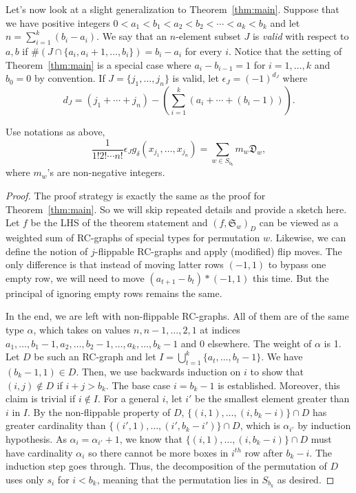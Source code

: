 \documentclass[10pt]{amsart}
\newcommand{\D}{\mathfrak{D}}
\begin{document}
Let's now look at a slight generalization to Theorem~\ref{thm:main}. Suppose that we have positive integers $0<a_1<b_1<a_2<b_2<\cdots<a_k<b_k$ and let $n=\sum_{i=1}^k(b_i-a_i)$. We say that an $n$-element subset $J$ is \emph{valid} with respect to $a,b$ if $\#(J\cap \{a_i,a_i+1,\ldots,b_i\})=b_i-a_i$ for every $i$. Notice that the setting of Theorem~\ref{thm:main} is a special case where $a_{i}-b_{i-1}=1$ for $i=1,\ldots,k$ and $b_{0}=0$ by convention. If $J=\{j_1,\ldots,j_n\}$ is valid, let $\epsilon_J=(-1)^{d_J}$ where 
\[
d_J=(j_1+\cdots+j_n)-\left(\sum_{i=1}^k(a_i+\cdots+(b_i-1))\right).
\]

\begin{theorem}\label{thm:gen}
Use notations as above, 
\[
\frac{1}{1!2!\cdots n!}\epsilon_Jg_{\delta}(x_{j_1},\ldots,x_{j_n})=\sum_{w\in S_{b_k}}m_w\D_w,
\]
where $m_w$'s are non-negative integers.
\end{theorem}
\begin{proof}
The proof strategy is exactly the same as the proof for Theorem~\ref{thm:main}. So we will skip repeated details and provide a sketch here. Let $f$ be the LHS of the theorem statement and $(f,\mathfrak{S}_w)_D$ can be viewed as a weighted sum of RC-graphs of special types for permutation $w$. Likewise, we can define the notion of $j$-flippable RC-graphs and apply (modified) flip moves. The only difference is that instead of moving latter rows $(-1,1)$ to bypass one empty row, we will need to move $(a_{t+1}-b_t)*(-1,1)$ this time. But the principal of ignoring empty rows remains the same. 

In the end, we are left with non-flippable RC-graphs. All of them are of the same type $\alpha$, which takes on values $n,n-1,\ldots,2,1$ at indices $a_1,\ldots,b_1-1,a_2,\ldots,b_2-1,\ldots,a_k,\ldots,b_k-1$ and 0 elsewhere. The weight of $\alpha$ is 1. Let $D$ be such an RC-graph and let $I=\bigcup_{t=1}^k\{a_t,\ldots,b_t-1\}$. We have $(b_k-1,1)\in D$. Then, we use backwards induction on $i$ to show that $(i,j)\notin D$ if $i+j>b_k$. The base case $i=b_k-1$ is established. Moreover, this claim is trivial if $i\notin I$. For a general $i$, let $i'$ be the smallest element greater than $i$ in $I$. By the non-flippable property of $D$, $\{(i,1),\ldots,(i,b_k-i)\}\cap D$ has greater cardinality than $\{(i',1),\ldots,(i',b_k-i')\}\cap D$, which is $\alpha_{i'}$ by induction hypothesis. As $\alpha_i=\alpha_{i'}+1$, we know that $\{(i,1),\ldots,(i,b_k-i)\}\cap D$ must have cardinality $\alpha_i$ so there cannot be more boxes in $i^{th}$ row after $b_k-i$. The induction step goes through. Thus, the decomposition of the permutation of $D$ uses only $s_i$ for $i<b_k$, meaning that the permutation lies in $S_{b_k}$ as desired.
\end{proof}




\end{document}
